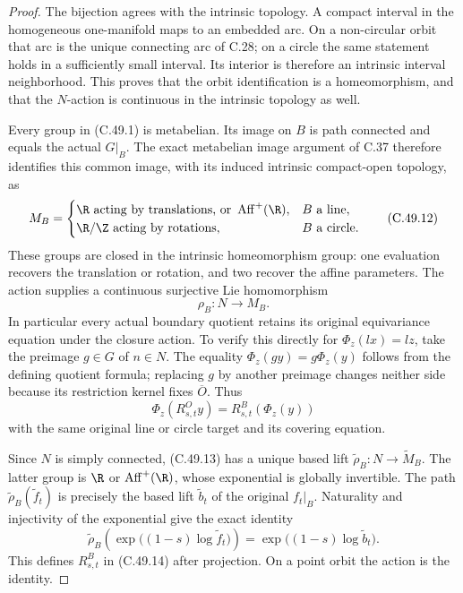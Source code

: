 \begin{proof}
The bijection agrees with the intrinsic topology.
A compact interval in the homogeneous one-manifold maps
to an embedded arc. On a non-circular orbit that arc is
the unique connecting arc of C.28; on a circle the same
statement holds in a sufficiently small interval.
Its interior is therefore an intrinsic interval
neighborhood. This proves that the orbit identification
is a homeomorphism, and that the $N$-action is continuous
in the intrinsic topology as well.

Every group in (C.49.1) is metabelian.
Its image on $B$ is path connected and equals the actual
$G|_B$. The exact metabelian image argument of C.37
therefore identifies this common image, with its induced
intrinsic compact-open topology, as
\[
 M_B=
 \begin{cases}
   \R\text{ acting by translations, or }
        \operatorname{Aff}^+(\R),&B\text{ a line},\\
   \R/\Z\text{ acting by rotations},&B\text{ a circle}.
 \end{cases}                                           \tag{C.49.12}
\]
These groups are closed in the intrinsic homeomorphism
group: one evaluation recovers the translation or
rotation, and two recover the affine parameters.
The action supplies a continuous surjective Lie
homomorphism
\[
                            \rho_B:N\to M_B.            \tag{C.49.13}
\]
In particular every actual boundary quotient retains its
original equivariance equation under the closure action.
To verify this directly for
$\Phi_z(lx)=lz$, take the preimage $g\in G$ of $n\in N$.
The equality $\Phi_z(gy)=g\Phi_z(y)$ follows from the
defining quotient formula; replacing $g$ by another
preimage changes neither side because its restriction
kernel fixes $\overline O$. Thus
\[
            \Phi_z(R^O_{s,t}y)
                   = R^B_{s,t}(\Phi_z(y))               \tag{C.49.14}
\]
with the same original line or circle target and its
covering equation.

Since $N$ is simply connected, (C.49.13) has a unique
based lift $\widetilde\rho_B:N\to\widetilde M_B$.
The latter group is $\R$ or $\operatorname{Aff}^+(\R)$,
whose exponential is globally invertible.
The path $\widetilde\rho_B(\widetilde f_t)$ is precisely
the based lift $\widetilde b_t$ of the original
$f_t|_B$. Naturality and injectivity of the exponential
give the exact identity
\[
 \widetilde\rho_B
       \left(\exp\bigl((1-s)\log\widetilde f_t\bigr)\right)
       =\exp\bigl((1-s)\log\widetilde b_t\bigr).          \tag{C.49.15}
\]
This defines $R^B_{s,t}$ in (C.49.14) after projection.
On a point orbit the action is the identity.


\end{proof}
